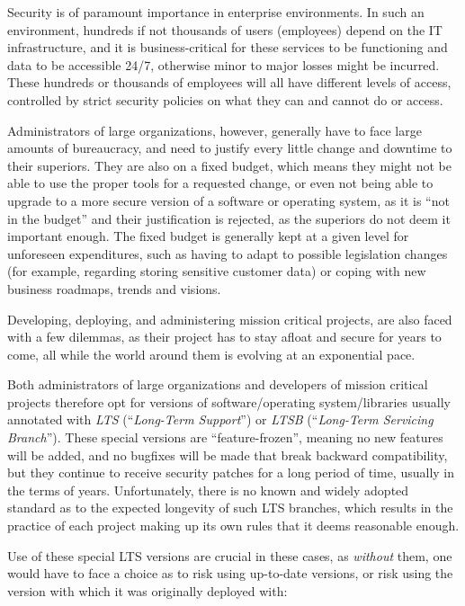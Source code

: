 \documentclass[a4paper,12pt]{article}
\begin{document}
	Security is of paramount importance in enterprise environments. In such an environment, hundreds if not thousands of users (employees) depend on the IT infrastructure, and it is business-critical for these services to be functioning and data to be accessible 24/7, otherwise minor to major losses might be incurred. These hundreds or thousands of employees will all have different levels of access, controlled by strict security policies on what they can and cannot do or access.
	
	Administrators of large organizations, however, generally have to face large amounts of bureaucracy, and need to justify every little change and downtime to their superiors. They are also on a fixed budget, which means they might not be able to use the proper tools for a requested change, or even not being able to upgrade to a more secure version of a software or operating system, as it is ``not in the budget'' and their justification is rejected, as the superiors do not deem it important enough. The fixed budget is generally kept at a given level for unforeseen expenditures, such as having to adapt to possible legislation changes (for example, regarding storing sensitive customer data) or coping with new business roadmaps, trends and visions.\cite{gkreiz06}
	
	Developing, deploying, and administering mission critical projects, are also faced with a few dilemmas, as their project has to stay afloat and secure for years to come, all while the world around them is evolving at an exponential pace.
	
	Both administrators of large organizations and developers of mission critical projects therefore opt for versions of software/operating system/libraries usually annotated with \textit{LTS} (``\textit{Long-Term Support}'') or \textit{LTSB} (``\textit{Long-Term Servicing Branch}''). These special versions are ``feature-frozen'', meaning no new features will be added, and no bugfixes will be made that break backward compatibility, but they continue to receive security patches for a long period of time, usually in the terms of years. Unfortunately, there is no known and widely adopted standard as to the expected longevity of such LTS branches, which results in the practice of each project making up its own rules that it deems reasonable enough.
	
	Use of these special LTS versions are crucial in these cases, as \textit{without} them, one would have to face a choice as to risk using up-to-date versions, or risk using the version with which it was originally deployed with:
	
\end{document}
